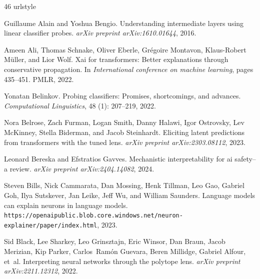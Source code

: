 \begin{thebibliography}{46}
\providecommand{\natexlab}[1]{#1}
\providecommand{\url}[1]{\texttt{#1}}
\expandafter\ifx\csname urlstyle\endcsname\relax
  \providecommand{\doi}[1]{doi: #1}\else
  \providecommand{\doi}{doi: \begingroup \urlstyle{rm}\Url}\fi

Guillaume Alain and Yoshua Bengio.
\newblock Understanding intermediate layers using linear classifier probes.
\newblock \emph{arXiv preprint arXiv:1610.01644}, 2016.

Ameen Ali, Thomas Schnake, Oliver Eberle, Gr{\'e}goire Montavon, Klaus-Robert M{\"u}ller, and Lior Wolf.
\newblock Xai for transformers: Better explanations through conservative propagation.
\newblock In \emph{International conference on machine learning}, pages 435--451. PMLR, 2022.

Yonatan Belinkov.
\newblock Probing classifiers: Promises, shortcomings, and advances.
\newblock \emph{Computational Linguistics}, 48 (1): 207--219, 2022.

Nora Belrose, Zach Furman, Logan Smith, Danny Halawi, Igor Ostrovsky, Lev McKinney, Stella Biderman, and Jacob Steinhardt.
\newblock Eliciting latent predictions from transformers with the tuned lens.
\newblock \emph{arXiv preprint arXiv:2303.08112}, 2023.

Leonard Bereska and Efstratios Gavves.
\newblock Mechanistic interpretability for ai safety--a review.
\newblock \emph{arXiv preprint arXiv:2404.14082}, 2024.

Steven Bills, Nick Cammarata, Dan Mossing, Henk Tillman, Leo Gao, Gabriel Goh, Ilya Sutskever, Jan Leike, Jeff Wu, and William Saunders.
\newblock Language models can explain neurons in language models.
\newblock \url{https://openaipublic.blob.core.windows.net/neuron-explainer/paper/index.html}, 2023.

Sid Black, Lee Sharkey, Leo Grinsztajn, Eric Winsor, Dan Braun, Jacob Merizian, Kip Parker, Carlos~Ram{\'o}n Guevara, Beren Millidge, Gabriel Alfour, et~al.
\newblock Interpreting neural networks through the polytope lens.
\newblock \emph{arXiv preprint arXiv:2211.12312}, 2022.


\end{thebibliography}
